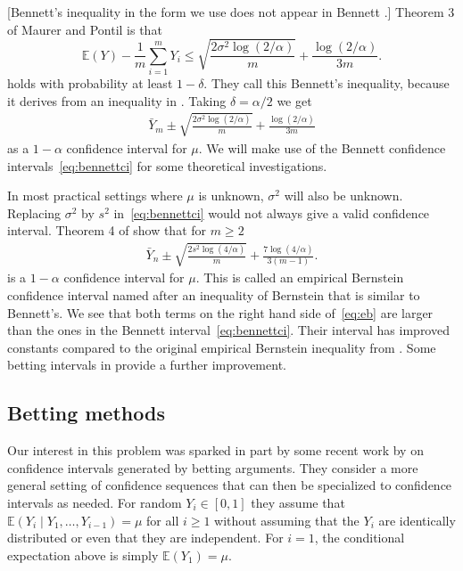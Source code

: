 \documentclass{article}
\newcommand{\art}[1]{\begingroup\color{blue}#1\endgroup}
\renewcommand{\le}{\leqslant}
\renewcommand{\ge}{\geqslant}
\newcommand{\e}{\mathbb{E}}
\newcommand{\giv}{\!\mid\!} %
\begin{document}
\art{[Bennett's inequality in the form we use
does not appear in Bennett \cite{benn:1962}.]
Theorem 3 of Maurer and Pontil \cite{maurer2009empirical}
is that
$$
\e(Y) - \frac1m\sum_{i=1}^mY_i \le \sqrt{\frac{2\sigma^2\log(2/\alpha)}m}
+ \frac{\log(2/\alpha)}{3m}.
  $$
holds with probability at least $1-\delta$.
They call this Bennett's inequality, because it derives
from an inequality in \cite{benn:1962}.}
Taking $\delta =\alpha/2$ we get
\begin{align}\label{eq:bennettci}
\bar Y_m \pm \sqrt{\frac{2\sigma^2\log(2/\alpha)}m}
+ \frac{\log(2/\alpha)}{3m}
\end{align}
as a $1-\alpha$ confidence interval for $\mu$.
We will make use of the Bennett confidence
intervals~\eqref{eq:bennettci} for some
theoretical investigations. 

In most practical settings where $\mu$ is unknown,
$\sigma^2$ will also be unknown. Replacing $\sigma^2$
by $s^2$ in~\eqref{eq:bennettci} would not always
give a valid confidence interval.  
Theorem 4 of \cite{maurer2009empirical} show that
for $m\ge2$
\begin{align}\label{eq:eb}
    \bar Y_n\pm
\sqrt{\frac{2s^2\log(4/\alpha)}m}
+ \frac{7\log(4/\alpha)}{3(m-1)}.
\end{align}
is a $1-\alpha$ confidence interval for $\mu$.
This is called an empirical Bernstein confidence
interval named after an inequality of Bernstein
that is similar to Bennett's.  We see that both terms
on the right hand side of~\eqref{eq:eb} are larger
than the ones in the Bennett interval~\eqref{eq:bennettci}.
Their interval has improved constants compared to the original
empirical Bernstein inequality from
\cite{audi:muno:szep:2007}. Some betting intervals
in \cite{WauRam24a} provide a further improvement.





\subsection{Betting methods}

Our interest in this problem was sparked in part by some recent
work by \cite{WauRam24a} on confidence intervals generated
by betting arguments.  They consider a more general setting
of confidence sequences that can then be specialized to
confidence intervals as needed.  
For random $Y_i\in[0,1]$ they assume
that $\e(Y_i\giv Y_1,\dots,Y_{i-1})=\mu$ for all $i\ge1$ 
without assuming
that the $Y_i$ are identically distributed or even that
they are independent. For $i=1$, the conditional expectation 
above is simply $\e(Y_1)=\mu$.
\end{document}
